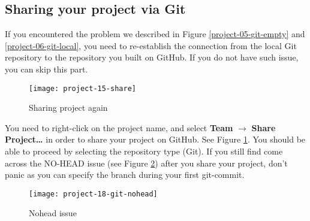 \subsection{Sharing your project via Git}

If you encountered the problem we described in Figure \ref{project-05-git-empty} and \ref{project-06-git-local}, you need to re-establish the connection from the local Git repository to the repository you built on GitHub. If you do not have such issue, you can skip this part.

\begin{figure}[t]
\centering
\texttt{[image: project-15-share]}
\caption{Sharing project again\label{project-15-share}}
\end{figure}

You need to right-click on the project name, and select \textbf{Team} $\rightarrow$ \textbf{Share Project\ldots} in order to share your project on GitHub. See Figure \ref{project-15-share}. You should be able to proceed by selecting the repository type (Git). If you still find come across the NO-HEAD issue (see Figure \ref{project-18-git-nohead}) after you share your project, don't panic as you can specify the branch during your first git-commit.

\begin{figure}[t]
\centering
\texttt{[image: project-18-git-nohead]}
\caption{Nohead issue\label{project-18-git-nohead}}
\end{figure}


